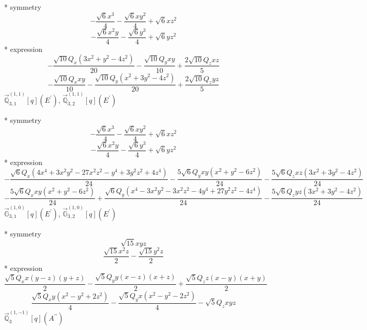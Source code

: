 \documentclass[fleqn,8pt]{jsarticle}
\begin{document}
\noindent\quad ** symmetry
\begin{dmath*}
- \frac{\sqrt{6} x^{3}}{4} - \frac{\sqrt{6} x y^{2}}{4} + \sqrt{6} x z^{2}
\end{dmath*}
\begin{dmath*}
- \frac{\sqrt{6} x^{2} y}{4} - \frac{\sqrt{6} y^{3}}{4} + \sqrt{6} y z^{2}
\end{dmath*}
\noindent\quad ** expression
\begin{dmath*}
- \frac{\sqrt{10} Q_{x} \left(3 x^{2} + y^{2} - 4 z^{2}\right)}{20} - \frac{\sqrt{10} Q_{y} x y}{10} + \frac{2 \sqrt{10} Q_{z} x z}{5}
\end{dmath*}
\begin{dmath*}
- \frac{\sqrt{10} Q_{x} x y}{10} - \frac{\sqrt{10} Q_{y} \left(x^{2} + 3 y^{2} - 4 z^{2}\right)}{20} + \frac{2 \sqrt{10} Q_{z} y z}{5}
\end{dmath*}
\noindent\quad $\vec{\mathbb{Q}}_{3,1}^{(1,1)}[q](E^{\prime})$, $\vec{\mathbb{Q}}_{3,2}^{(1,1)}[q](E^{\prime})$

\noindent\quad ** symmetry
\begin{dmath*}
- \frac{\sqrt{6} x^{3}}{4} - \frac{\sqrt{6} x y^{2}}{4} + \sqrt{6} x z^{2}
\end{dmath*}
\begin{dmath*}
- \frac{\sqrt{6} x^{2} y}{4} - \frac{\sqrt{6} y^{3}}{4} + \sqrt{6} y z^{2}
\end{dmath*}
\noindent\quad ** expression
\begin{dmath*}
- \frac{\sqrt{6} Q_{x} \left(4 x^{4} + 3 x^{2} y^{2} - 27 x^{2} z^{2} - y^{4} + 3 y^{2} z^{2} + 4 z^{4}\right)}{24} - \frac{5 \sqrt{6} Q_{y} x y \left(x^{2} + y^{2} - 6 z^{2}\right)}{24} - \frac{5 \sqrt{6} Q_{z} x z \left(3 x^{2} + 3 y^{2} - 4 z^{2}\right)}{24}
\end{dmath*}
\begin{dmath*}
- \frac{5 \sqrt{6} Q_{x} x y \left(x^{2} + y^{2} - 6 z^{2}\right)}{24} + \frac{\sqrt{6} Q_{y} \left(x^{4} - 3 x^{2} y^{2} - 3 x^{2} z^{2} - 4 y^{4} + 27 y^{2} z^{2} - 4 z^{4}\right)}{24} - \frac{5 \sqrt{6} Q_{z} y z \left(3 x^{2} + 3 y^{2} - 4 z^{2}\right)}{24}
\end{dmath*}
\noindent\quad $\vec{\mathbb{G}}_{3,1}^{(1,0)}[q](E^{\prime})$, $\vec{\mathbb{G}}_{3,2}^{(1,0)}[q](E^{\prime})$

\noindent\quad ** symmetry
\begin{dmath*}
\sqrt{15} x y z
\end{dmath*}
\begin{dmath*}
\frac{\sqrt{15} x^{2} z}{2} - \frac{\sqrt{15} y^{2} z}{2}
\end{dmath*}
\noindent\quad ** expression
\begin{dmath*}
\frac{\sqrt{5} Q_{x} x \left(y - z\right) \left(y + z\right)}{2} - \frac{\sqrt{5} Q_{y} y \left(x - z\right) \left(x + z\right)}{2} + \frac{\sqrt{5} Q_{z} z \left(x - y\right) \left(x + y\right)}{2}
\end{dmath*}
\begin{dmath*}
\frac{\sqrt{5} Q_{x} y \left(x^{2} - y^{2} + 2 z^{2}\right)}{4} - \frac{\sqrt{5} Q_{y} x \left(x^{2} - y^{2} - 2 z^{2}\right)}{4} - \sqrt{5} Q_{z} x y z
\end{dmath*}
\noindent\quad $\vec{\mathbb{Q}}_{3}^{(1,-1)}[q](A^{\prime\prime})$
\end{document}
